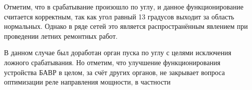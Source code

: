Отметим, что в срабатывание произошло по углу, и данное функционирование считается корректным, так как угол равный 13 градусов выходит за область нормальных. Однако в ряде сетей это является распространённым явлением при проведении летних ремонтных работ.

В данном случае был доработан орган пуска по углу с целями исключения ложного срабатывания. Но отметим, что улучшение функционирования устройства БАВР в целом, за счёт других органов, не закрывает вопроса оптимизации реле направления мощности, в частности
